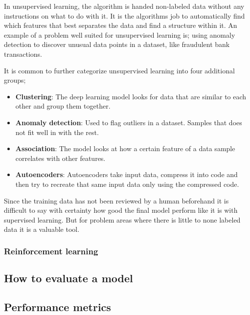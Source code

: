 \documentclass[thesis.tex]{subfiles}
\begin{document}
In unsupervised learning, the algorithm is handed non-labeled data without any instructions on what to do with it. It is the algorithms job to automatically find which features that best separates the data and find a structure within it.	An example of a problem well suited for unsupervised learning is; using anomaly detection to discover unusual data points in a dataset, like fraudulent bank transactions.

It is common to further categorize unsupervised learning into four additional groups;

\begin{itemize}
\item \textbf{Clustering}: The deep learning model looks for data that are similar to each other and group them together.
\item \textbf{Anomaly detection}: Used to flag outliers in a dataset. Samples that does not fit well in with the rest.
\item \textbf{Association}: The model looks at how a certain feature of a data sample correlates with other features.
\item \textbf{Autoencoders}: Autoencoders take input data, compress it into code and then try to recreate that same input data only using the compressed code.
\end{itemize}

Since the training data has not been reviewed by a human beforehand it is difficult to say with certainty how good the final model perform like it is with supervised learning. But for problem areas where there is little to none labeled data it is a valuable tool.


\subsubsection{Reinforcement learning} \label{sec:reinforcement learning}



\subsection{How to evaluate a model}

\subsection{Performance metrics}
\end{document}
